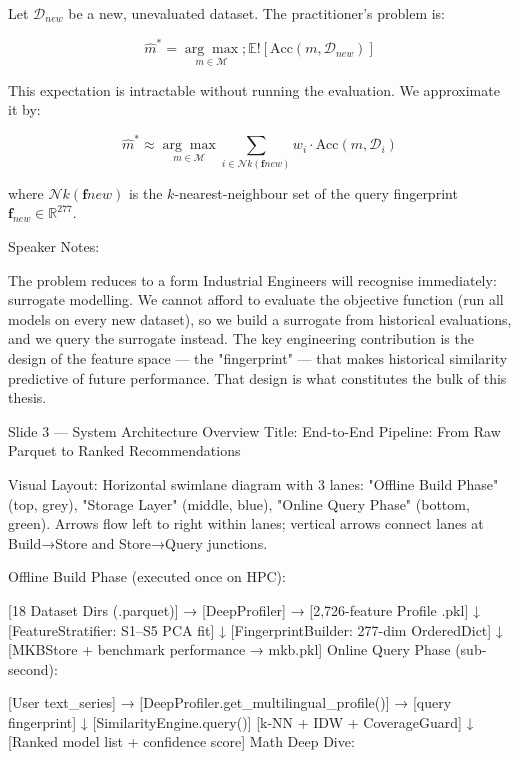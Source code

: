 Let $\mathcal{D}_{new}$ be a new, unevaluated dataset. The practitioner's problem is:

$$\hat{m}^* = \underset{m \in \mathcal{M}}{\arg\max} ; \mathbb{E}!\left[\text{Acc}(m, \mathcal{D}_{new})\right]$$

This expectation is intractable without running the evaluation. We approximate it by:

$$\hat{m}^* \approx \underset{m \in \mathcal{M}}{\arg\max} \sum_{i \in \mathcal{N}k(\mathbf{f}{new})} w_i \cdot \text{Acc}(m, \mathcal{D}_i)$$

where $\mathcal{N}k(\mathbf{f}{new})$ is the $k$-nearest-neighbour set of the query fingerprint $\mathbf{f}_{new} \in \mathbb{R}^{277}$.

Speaker Notes:

The problem reduces to a form Industrial Engineers will recognise immediately: surrogate modelling. We cannot afford to evaluate the objective function (run all models on every new dataset), so we build a surrogate from historical evaluations, and we query the surrogate instead. The key engineering contribution is the design of the feature space — the "fingerprint" — that makes historical similarity predictive of future performance. That design is what constitutes the bulk of this thesis.

Slide 3 — System Architecture Overview
Title: End-to-End Pipeline: From Raw Parquet to Ranked Recommendations

Visual Layout: Horizontal swimlane diagram with 3 lanes: "Offline Build Phase" (top, grey), "Storage Layer" (middle, blue), "Online Query Phase" (bottom, green). Arrows flow left to right within lanes; vertical arrows connect lanes at Build→Store and Store→Query junctions.

Offline Build Phase (executed once on HPC):


[18 Dataset Dirs (.parquet)] → [DeepProfiler] → [2,726-feature Profile .pkl]
                                                       ↓
                                    [FeatureStratifier: S1–S5 PCA fit]
                                                       ↓
                                    [FingerprintBuilder: 277-dim OrderedDict]
                                                       ↓
                                    [MKBStore + benchmark performance → mkb.pkl]
Online Query Phase (sub-second):


[User text_series] → [DeepProfiler.get_multilingual_profile()] → [query fingerprint]
                                                                       ↓
                                                   [SimilarityEngine.query()]
                                                   [k-NN + IDW + CoverageGuard]
                                                                       ↓
                                              [Ranked model list + confidence score]
Math Deep Dive:

